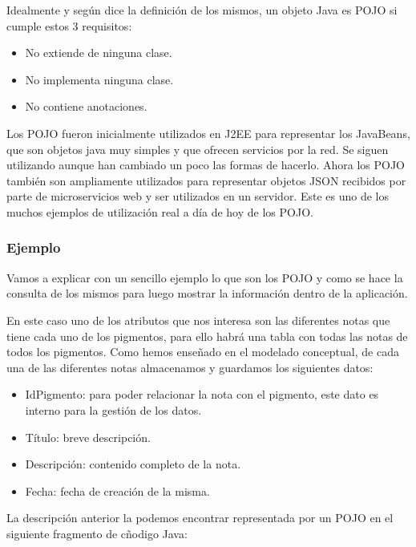 Idealmente y según dice la definición de los mismos, un objeto Java es POJO si cumple estos 3 requisitos:
\begin{itemize}
    \item No extiende de ninguna clase. 
        \begin{figure}[H]
        
        \label{fig:noExtiende}
        \end{figure}
    
    \item No implementa ninguna clase. 
        \begin{figure}[H]
        
        \label{fig:noImplementa}
        \end{figure}
        
    \item No contiene anotaciones. 
        \begin{figure}[H] 
        
        \label{fig:noAnotaciones}
        \end{figure}
\end{itemize}

Los POJO fueron inicialmente utilizados en J2EE para representar los JavaBeans, que son objetos java muy simples y que ofrecen servicios por la red. Se siguen utilizando aunque han cambiado un poco las formas de hacerlo. Ahora los POJO también son ampliamente utilizados para representar objetos JSON recibidos por parte de microservicios web y ser utilizados en un servidor. Este es uno de los muchos ejemplos de utilización real a día de hoy de los POJO. 

\subsubsection{Ejemplo}

Vamos a explicar con un sencillo ejemplo lo que son los POJO y como se hace la consulta de los mismos para luego mostrar la información dentro de la aplicación.

En este caso uno de los atributos que nos interesa son las diferentes notas que tiene cada uno de los pigmentos, para ello habrá una tabla con todas las notas de todos los pigmentos. Como hemos enseñado en el modelado conceptual, de cada una de las diferentes notas almacenamos y guardamos los siguientes datos: 
\begin{itemize}
    \item IdPigmento: para poder relacionar la nota con el pigmento, este dato es interno para la gestión de los datos. 
    \item Título: breve descripción.
    \item Descripción: contenido completo de la nota. 
    \item Fecha: fecha de creación de la misma. 
\end{itemize}

La descripción anterior la podemos encontrar representada por un POJO en el siguiente fragmento de cñodigo Java: 

\begin{figure}[H] 

\label{fig:notaPojo}
\end{figure}




